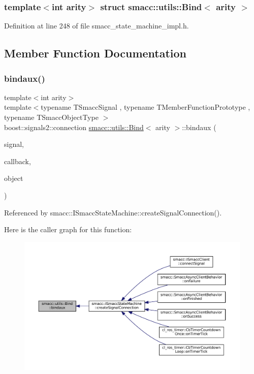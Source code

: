 \subsubsection*{template$<$int arity$>$\newline
struct smacc\+::utils\+::\+Bind$<$ arity $>$}



Definition at line 248 of file smacc\+\_\+state\+\_\+machine\+\_\+impl.\+h.



\subsection{Member Function Documentation}
\mbox{\label{structsmacc_1_1utils_1_1Bind_aa0f4ba76fbd5fdb865df51b61d4269f3}} 
\subsubsection{\texorpdfstring{bindaux()}{bindaux()}}
{\footnotesize\ttfamily template$<$int arity$>$ \\
template$<$typename T\+Smacc\+Signal , typename T\+Member\+Function\+Prototype , typename T\+Smacc\+Object\+Type $>$ \\
boost\+::signals2\+::connection \hyperlink{structsmacc_1_1utils_1_1Bind}{smacc\+::utils\+::\+Bind}$<$ arity $>$\+::bindaux (\begin{DoxyParamCaption}\item[{T\+Smacc\+Signal \&}]{signal,  }\item[{T\+Member\+Function\+Prototype}]{callback,  }\item[{T\+Smacc\+Object\+Type $\ast$}]{object }\end{DoxyParamCaption})}



Referenced by smacc\+::\+I\+Smacc\+State\+Machine\+::create\+Signal\+Connection().

Here is the caller graph for this function\+:
\nopagebreak
\begin{figure}[H]
\begin{center}
\leavevmode
\includegraphics[width=350pt]{structsmacc_1_1utils_1_1Bind_aa0f4ba76fbd5fdb865df51b61d4269f3_icgraph}
\end{center}
\end{figure}



